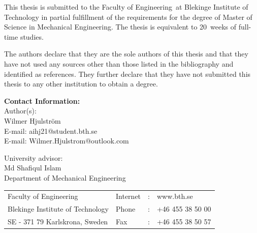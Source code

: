 \documentclass[a4paper,twoside]{bth}
\makeatletter
\newcommand{\thesisDegree}{Master of Science in Mechanical Engineering}
\newcommand{\faculty}{Engineering}
\newcommand{\thesisWeeks}{20}
\newcommand{\authorFirst}{Wilmer Hjulström}
\newcommand{\authorFirstMail}{aihj21@student.bth.se\\E-mail: Wilmer.Hjulstrom@outlook.com}
\newcommand{\super}{Md Shafiqul Islam}
\newcommand{\superAffiliation}{Mechanical Engineering}
\makeatother
\begin{document}
{\pagestyle{empty}
\changepage{3cm}{1cm}{-0.5cm}{-0.5cm}{}{-1.5cm}{}{}{}

{\small
\noindent
This thesis is submitted to the Faculty of \faculty $\,$ at Blekinge Institute
of Technology in partial fulfillment of the requirements for the degree of
\thesisDegree. The thesis is equivalent to \thesisWeeks $\,$ weeks of full-time studies.

\vspace{1cm}

\noindent
The authors declare that they are the sole authors of this thesis and that they have
not used any sources other than those listed in the bibliography and identified as references.
They further declare that they have not submitted this thesis to any other institution to
obtain a degree.
}

\vspace{10cm}

\noindent
\textbf{Contact Information:} \\
Author(s): \\
\authorFirst \\
E-mail: \authorFirstMail \\

\vspace{2cm}

\noindent
University advisor: \\
\super \\
Department of \superAffiliation

\vspace*{\fill}

\noindent
\begin{tabular}{@{}p{} l c l}
Faculty of \faculty              & Internet & : & www.bth.se \\
Blekinge Institute of Technology & Phone    & : & +46 455 38 50 00 \\
SE - 371 79 Karlskrona, Sweden    & Fax      & : & +46 455 38 50 57 \\
\end{tabular}
\clearpage
} %

\setcounter{page}{1}


\abstract
\end{document}

